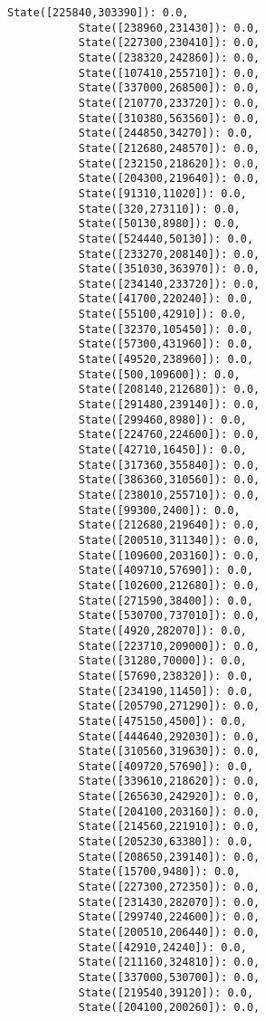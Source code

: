 \documentclass[11pt]{article}
\begin{document}
\begin{Verbatim}[commandchars=\\\{\}]
           State([225840,303390]): 0.0,
           State([238960,231430]): 0.0,
           State([227300,230410]): 0.0,
           State([238320,242860]): 0.0,
           State([107410,255710]): 0.0,
           State([337000,268500]): 0.0,
           State([210770,233720]): 0.0,
           State([310380,563560]): 0.0,
           State([244850,34270]): 0.0,
           State([212680,248570]): 0.0,
           State([232150,218620]): 0.0,
           State([204300,219640]): 0.0,
           State([91310,11020]): 0.0,
           State([320,273110]): 0.0,
           State([50130,8980]): 0.0,
           State([524440,50130]): 0.0,
           State([233270,208140]): 0.0,
           State([351030,363970]): 0.0,
           State([234140,233720]): 0.0,
           State([41700,220240]): 0.0,
           State([55100,42910]): 0.0,
           State([32370,105450]): 0.0,
           State([57300,431960]): 0.0,
           State([49520,238960]): 0.0,
           State([500,109600]): 0.0,
           State([208140,212680]): 0.0,
           State([291480,239140]): 0.0,
           State([299460,8980]): 0.0,
           State([224760,224600]): 0.0,
           State([42710,16450]): 0.0,
           State([317360,355840]): 0.0,
           State([386360,310560]): 0.0,
           State([238010,255710]): 0.0,
           State([99300,2400]): 0.0,
           State([212680,219640]): 0.0,
           State([200510,311340]): 0.0,
           State([109600,203160]): 0.0,
           State([409710,57690]): 0.0,
           State([102600,212680]): 0.0,
           State([271590,38400]): 0.0,
           State([530700,737010]): 0.0,
           State([4920,282070]): 0.0,
           State([223710,209000]): 0.0,
           State([31280,70000]): 0.0,
           State([57690,238320]): 0.0,
           State([234190,11450]): 0.0,
           State([205790,271290]): 0.0,
           State([475150,4500]): 0.0,
           State([444640,292030]): 0.0,
           State([310560,319630]): 0.0,
           State([409720,57690]): 0.0,
           State([339610,218620]): 0.0,
           State([265630,242920]): 0.0,
           State([204100,203160]): 0.0,
           State([214560,221910]): 0.0,
           State([205230,63380]): 0.0,
           State([208650,239140]): 0.0,
           State([15700,9480]): 0.0,
           State([227300,272350]): 0.0,
           State([231430,282070]): 0.0,
           State([299740,224600]): 0.0,
           State([200510,206440]): 0.0,
           State([42910,24240]): 0.0,
           State([211160,324810]): 0.0,
           State([337000,530700]): 0.0,
           State([219540,39120]): 0.0,
           State([204100,200260]): 0.0,

\end{Verbatim}
\end{document}

